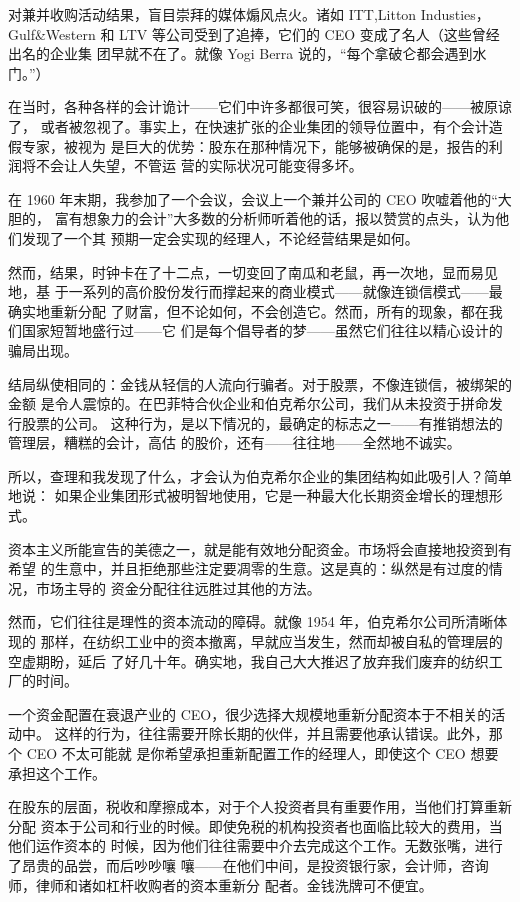\documentclass[UTF8,a4paper,zihao=-4,fontset = windows]{ctexart} %
\begin{document}
对兼并收购活动结果，盲目崇拜的媒体煽风点火。诸如 ITT,Litton Industies，
Gulf\&Western 和 LTV 等公司受到了追捧，它们的 CEO 变成了名人（这些曾经出名的企业集
团早就不在了。就像 Yogi Berra 说的，“每个拿破仑都会遇到水门。”）

在当时，各种各样的会计诡计——它们中许多都很可笑，很容易识破的——被原谅了，
或者被忽视了。事实上，在快速扩张的企业集团的领导位置中，有个会计造假专家，被视为
是巨大的优势：股东在那种情况下，能够被确保的是，报告的利润将不会让人失望，不管运
营的实际状况可能变得多坏。

在 1960 年末期，我参加了一个会议，会议上一个兼并公司的 CEO 吹嘘着他的“大胆的，
富有想象力的会计”大多数的分析师听着他的话，报以赞赏的点头，认为他们发现了一个其
预期一定会实现的经理人，不论经营结果是如何。

然而，结果，时钟卡在了十二点，一切变回了南瓜和老鼠，再一次地，显而易见地，基
于一系列的高价股份发行而撑起来的商业模式——就像连锁信模式——最确实地重新分配
了财富，但不论如何，不会创造它。然而，所有的现象，都在我们国家短暂地盛行过——它
们是每个倡导者的梦——虽然它们往往以精心设计的骗局出现。

结局纵使相同的：金钱从轻信的人流向行骗者。对于股票，不像连锁信，被绑架的金额
是令人震惊的。在巴菲特合伙企业和伯克希尔公司，我们从未投资于拼命发行股票的公司。
这种行为，是以下情况的，最确定的标志之一——有推销想法的管理层，糟糕的会计，高估
的股价，还有——往往地——全然地不诚实。

所以，查理和我发现了什么，才会认为伯克希尔企业的集团结构如此吸引人？简单地说：
如果企业集团形式被明智地使用，它是一种最大化长期资金增长的理想形式。

资本主义所能宣告的美德之一，就是能有效地分配资金。市场将会直接地投资到有希望
的生意中，并且拒绝那些注定要凋零的生意。这是真的：纵然是有过度的情况，市场主导的
资金分配往往远胜过其他的方法。

然而，它们往往是理性的资本流动的障碍。就像 1954 年，伯克希尔公司所清晰体现的
那样，在纺织工业中的资本撤离，早就应当发生，然而却被自私的管理层的空虚期盼，延后
了好几十年。确实地，我自己大大推迟了放弃我们废弃的纺织工厂的时间。

一个资金配置在衰退产业的 CEO，很少选择大规模地重新分配资本于不相关的活动中。
这样的行为，往往需要开除长期的伙伴，并且需要他承认错误。此外，那个 CEO 不太可能就
是你希望承担重新配置工作的经理人，即使这个 CEO 想要承担这个工作。

在股东的层面，税收和摩擦成本，对于个人投资者具有重要作用，当他们打算重新分配
资本于公司和行业的时候。即使免税的机构投资者也面临比较大的费用，当他们运作资本的
时候，因为他们往往需要中介去完成这个工作。无数张嘴，进行了昂贵的品尝，而后吵吵嚷
嚷——在他们中间，是投资银行家，会计师，咨询师，律师和诸如杠杆收购者的资本重新分
配者。金钱洗牌可不便宜。
\end{document}
